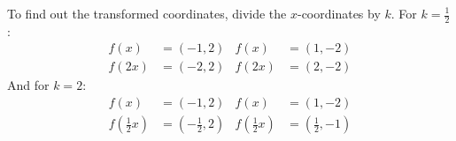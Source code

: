 To find out the transformed coordinates, divide the $x$-coordinates by $k$. For $k=\frac{1}{2}$:
\begin{align*}
f(x)&=(-1,2) & f(x)&=(1,-2)\\
f(2x)&=(-2,2) & f(2x)&=(2,-2)
\end{align*}
And for $k=2$:
\begin{align*}
f(x)&=(-1,2) & f(x)&=(1,-2)\\
f\left(\frac{1}{2}x\right)&=\left(-\frac{1}{2},2\right) & f\left(\frac{1}{2}x\right)&=\left(\frac{1}{2},-1\right)
\end{align*}
